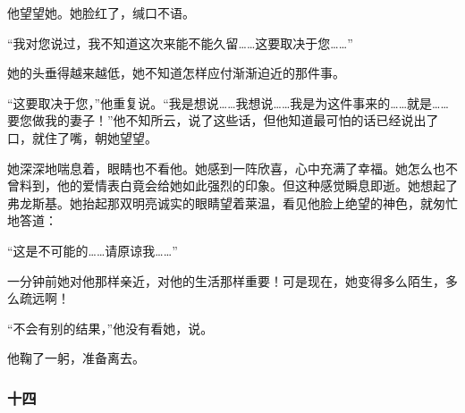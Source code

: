 \par 他望望她。她脸红了，缄口不语。
\par “我对您说过，我不知道这次来能不能久留……这要取决于您……”
\par 她的头垂得越来越低，她不知道怎样应付渐渐迫近的那件事。
\par “这要取决于您，”他重复说。“我是想说……我想说……我是为这件事来的……就是……要您做我的妻子！”他不知所云，说了这些话，但他知道最可怕的话已经说出了口，就住了嘴，朝她望望。
\par 她深深地喘息着，眼睛也不看他。她感到一阵欣喜，心中充满了幸福。她怎么也不曾料到，他的爱情表白竟会给她如此强烈的印象。但这种感觉瞬息即逝。她想起了弗龙斯基。她抬起那双明亮诚实的眼睛望着莱温，看见他脸上绝望的神色，就匆忙地答道：
\par “这是不可能的……请原谅我……”
\par 一分钟前她对他那样亲近，对他的生活那样重要！可是现在，她变得多么陌生，多么疏远啊！
\par “不会有别的结果，”他没有看她，说。
\par 他鞠了一躬，准备离去。


\subsubsection*{十四}

